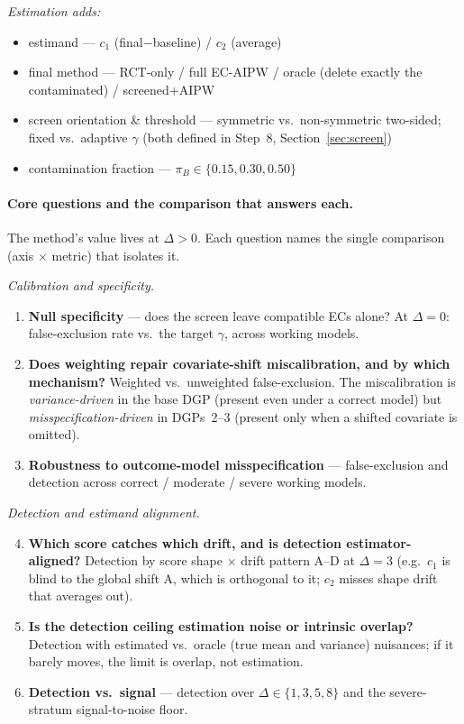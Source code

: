 \documentclass[11pt]{article}
\begin{document}
\emph{Estimation adds:}
\begin{itemize}
    \item estimand --- $c_1$ (final$-$baseline) / $c_2$ (average)
    \item final method --- RCT-only / full EC-AIPW / oracle (delete exactly the contaminated) / screened$+$AIPW
    \item screen orientation \& threshold --- symmetric vs.\ non-symmetric two-sided; fixed vs.\ adaptive $\gamma$ (both defined in Step~8, Section~\ref{sec:screen})
    \item contamination fraction --- $\pi_B\in\{0.15,0.30,0.50\}$
\end{itemize}

\paragraph{Core questions and the comparison that answers each.} The method's value lives at $\Delta>0$. Each question names the single comparison (axis $\times$ metric) that isolates it.

\emph{Calibration and specificity.}
\begin{enumerate}
    \item \textbf{Null specificity} --- does the screen leave compatible ECs alone? At $\Delta{=}0$: false-exclusion rate vs.\ the target $\gamma$, across working models.
    \item \textbf{Does weighting repair covariate-shift miscalibration, and by which mechanism?} Weighted vs.\ unweighted false-exclusion. The miscalibration is \emph{variance-driven} in the base DGP (present even under a correct model) but \emph{misspecification-driven} in DGPs~2--3 (present only when a shifted covariate is omitted).
    \item \textbf{Robustness to outcome-model misspecification} --- false-exclusion and detection across correct / moderate / severe working models.
\end{enumerate}

\emph{Detection and estimand alignment.}
\begin{enumerate}\setcounter{enumi}{3}
    \item \textbf{Which score catches which drift, and is detection estimator-aligned?} Detection by score shape $\times$ drift pattern A--D at $\Delta{=}3$ (e.g.\ $c_1$ is blind to the global shift A, which is orthogonal to it; $c_2$ misses shape drift that averages out).
    \item \textbf{Is the detection ceiling estimation noise or intrinsic overlap?} Detection with estimated vs.\ oracle (true mean and variance) nuisances; if it barely moves, the limit is overlap, not estimation.
    \item \textbf{Detection vs.\ signal} --- detection over $\Delta\in\{1,3,5,8\}$ and the severe-stratum signal-to-noise floor.
\end{enumerate}
\end{document}
